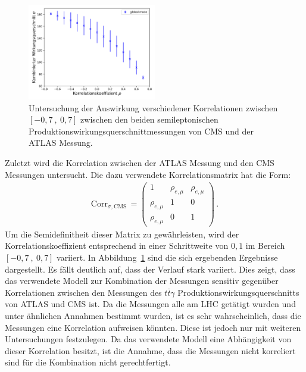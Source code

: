 \begin{figure}
  \centering
  \includegraphics[width=0.5\textwidth]{Plots/corr_CA.pdf}
  \caption{Untersuchung der Auswirkung verschiedener Korrelationen zwischen $[-0,7~,~0,7]$ zwischen den beiden semileptonischen Produktionswirkungsquerschnittmessungen von CMS und der ATLAS Messung.}
  \label{fig:corrCA}
\end{figure}
Zuletzt wird die Korrelation zwischen der ATLAS Messung und den CMS Messungen untersucht. Die dazu verwendete Korrelationsmatrix hat die Form:
\begin{align}
  \text{Corr}_{\sigma,\text{CMS}}\,=\begin{pmatrix}
  1 & \rho_{e, \mu} & \rho_{e, \mu}\\
  \rho_{e, \mu} & 1 &0\\
  \rho_{e, \mu} & 0 & 1
  \end{pmatrix} \, .
  \label{eqn:matrix2}
\end{align}
Um die Semidefinitheit dieser Matrix zu gewährleisten, wird der Korrelationskoeffizient entsprechend in einer Schrittweite von $0,1$ im Bereich $[-0,7~,~0,7]$ variiert. In Abbildung~\ref{fig:corrCA} sind die sich ergebenden Ergebnisse dargestellt. Es fällt deutlich auf, dass der Verlauf stark variiert.
Dies zeigt, dass das verwendete Modell zur Kombination der Messungen sensitiv gegenüber Korrelationen zwischen den Messungen des $t\bar{t}\gamma$ Produktionswirkungsquerschnitts von ATLAS und CMS ist.
Da die Messungen alle am LHC getätigt wurden und unter ähnlichen Annahmen bestimmt wurden, ist es sehr wahrscheinlich, dass die Messungen eine Korrelation aufweisen könnten. Diese ist jedoch nur mit weiteren Untersuchungen festzulegen. Da das verwendete Modell eine Abhängigkeit von dieser Korrelation besitzt, ist die Annahme, dass die Messungen nicht korreliert sind für die Kombination nicht gerechtfertigt.

